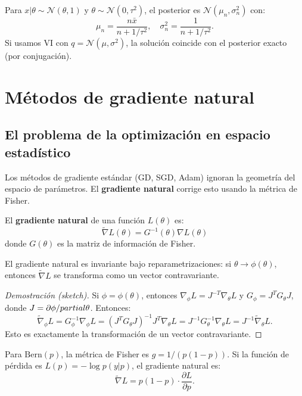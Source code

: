 \begin{example}
	Para $x | \theta \sim \mathcal{N}(\theta, 1)$ y $\theta \sim \mathcal{N}(0, \tau^2)$, el posterior es $\mathcal{N}(\mu_n, \sigma_n^2)$ con:
	\[
	\mu_n = \frac{n\bar{x}}{n + 1/\tau^2}, \quad \sigma_n^2 = \frac{1}{n + 1/\tau^2}.
	\]
	Si usamos VI con $q = \mathcal{N}(\mu, \sigma^2)$, la solución coincide con el posterior exacto (por conjugación).
\end{example}

\section{Métodos de gradiente natural}

\subsection{El problema de la optimización en espacio estadístico}

Los métodos de gradiente estándar (GD, SGD, Adam) ignoran la geometría del espacio de parámetros.  El \textbf{gradiente natural} corrige esto usando la métrica de Fisher.

\begin{definition}
	El \textbf{gradiente natural} de una función $L(\theta)$ es:
	\[
	\tilde{\nabla} L(\theta) = G^{-1}(\theta) \nabla L(\theta)
	\]
	donde $G(\theta)$ es la matriz de información de Fisher.
\end{definition}

\begin{theorem}
	El gradiente natural es invariante bajo reparametrizaciones: si $\theta \to \phi(\theta)$, entonces $\tilde{\nabla} L$ se transforma como un vector contravariante.
\end{theorem}

\begin{proof}[Demostración (sketch)]
	Si $\phi = \phi(\theta)$, entonces $\nabla_\phi L = J^{-T} \nabla_\theta L$ y $G_\phi = J^T G_\theta J$, donde $J = \partial\phi/\\partial\theta$.  Entonces:
	\[
	\tilde{\nabla}_\phi L = G_\phi^{-1} \nabla_\phi L = (J^T G_\theta J)^{-1} J^T \nabla_\theta L = J^{-1} G_\theta^{-1} \nabla_\theta L = J^{-1} \tilde{\nabla}_\theta L.
	\]
	Esto es exactamente la transformación de un vector contravariante.
\end{proof}

\begin{example}
	Para $\mathrm{Bern}(p)$, la métrica de Fisher es $g = 1/(p(1-p))$.  Si la función de pérdida es $L(p) = -\log p(y|p)$, el gradiente natural es:
	\[
	\tilde{\nabla} L = p(1-p) \cdot \frac{\partial L}{\partial p}.
	\]
\end{example}

